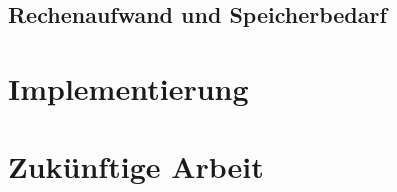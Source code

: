 \newpage
\section{Rechenaufwand und Speicherbedarf}
\label{ch:Content2:sec:Rechenaufwand}


\newpage
\chapter{Implementierung}
\label{ch:Implementierung}


\newpage
\chapter{Zukünftige Arbeit}
\label{ch:Content3:sec:ZukünftigeArbeit}




